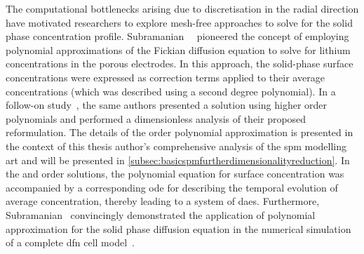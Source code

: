 The   computational   bottlenecks  arising   due   to   discretisation  in   the
radial   direction    have   motivated   researchers   to    explore   mesh-free
approaches   to    solve   for   the   solid    phase   concentration   profile.
Subramanian~\etal~\cite{Subramanian2004}  pioneered  the  concept  of  employing
polynomial approximations of the Fickian diffusion equation to solve for lithium
concentrations  in the  porous  electrodes. In  this  approach, the  solid-phase
surface  concentrations were  expressed  as correction  terms  applied to  their
average concentrations (which  was described using a  second degree polynomial).
In  a   follow-on  study~\cite{Subramanian2005},  the  same   authors  presented
a  solution  using  higher  order  polynomials  and  performed  a  dimensionless
analysis of  their proposed reformulation.  The details of  the 
order  polynomial approximation  is  presented  in the  context  of this  thesis
author's  comprehensive  analysis  of  the  \gls{spm}  modelling  art  and  will
be  presented  in \cref{subsec:basicspmfurtherdimensionalityreduction}.  In  the
 and   order solutions, the  polynomial equation
for  surface concentration  was  accompanied by  a  corresponding \gls{ode}  for
describing  the temporal  evolution  of average  concentration, thereby  leading
to  a  system  of  \glspl{dae}.  Furthermore,  Subramanian~\etal{}  convincingly
demonstrated the  application of  polynomial approximation  for the  solid phase
diffusion  equation in  the numerical  simulation of  a complete  \gls{dfn} cell
model~\cite{Subramanian2007}.


